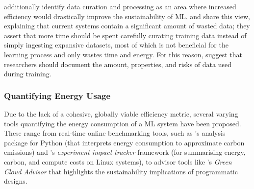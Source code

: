 \documentclass[a4paper, 12pt]{article}
\begin{document}
     additionally identify data curation and processing as an area where increased efficiency would drastically improve the sustainability of ML.  and  share this view, explaining that current systems contain a significant amount of wasted data; they assert that more time should be spent carefully curating training data instead of simply ingesting expansive datasets, most of which is not beneficial for the learning process and only wastes time and energy. For this reason,  suggest that researchers should document the amount, properties, and risks of data used during training.

    \subsubsection{Quantifying Energy Usage}

    Due to the lack of a cohesive, globally viable efficiency metric, several varying tools quantifying the energy consumption of a ML system have been proposed. These range from real-time online benchmarking tools, such as 's analysis package for Python (that interprets energy consumption to approximate carbon emissions) and 's \emph{experiment-impact-tracker} framework (for summarising energy, carbon, and compute costs on Linux systems), to advisor tools like 's \emph{Green Cloud Advisor} that highlights the sustainability implications of programmatic designs.
\end{document}
